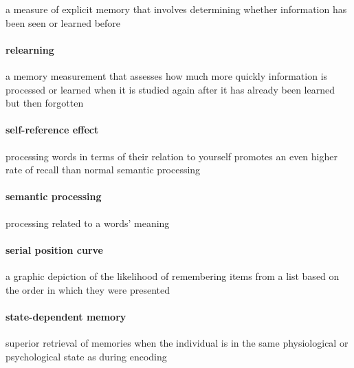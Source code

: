 \documentclass[
]{krantz}
\begin{document}
a measure of explicit memory that involves determining whether information has been seen or learned before

\hypertarget{relearning}{%
\paragraph*{relearning}\label{relearning}}

a memory measurement that assesses how much more quickly information is processed or learned when it is studied again after it has already been learned but then forgotten

\hypertarget{self-reference-effect}{%
\paragraph*{self-reference effect}\label{self-reference-effect}}

processing words in terms of their relation to yourself promotes an even higher rate of recall than normal semantic processing

\hypertarget{semantic-processing}{%
\paragraph*{semantic processing}\label{semantic-processing}}

processing related to a words' meaning

\hypertarget{serial-position-curve}{%
\paragraph*{serial position curve}\label{serial-position-curve}}

a graphic depiction of the likelihood of remembering items from a list based on the order in which they were presented

\hypertarget{state-dependent-memory}{%
\paragraph*{state-dependent memory}\label{state-dependent-memory}}

superior retrieval of memories when the individual is in the same physiological or psychological state as during encoding
\end{document}

